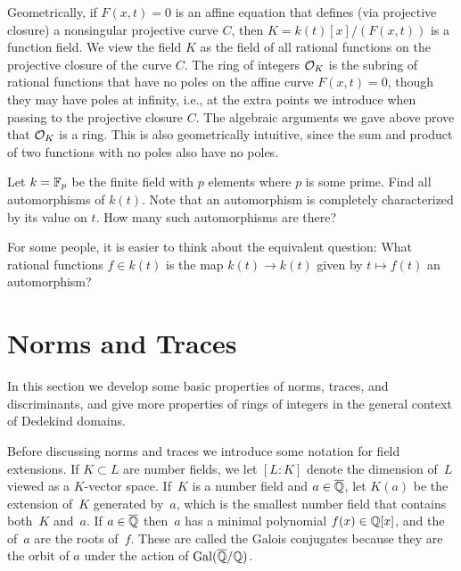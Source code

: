 Geometrically, if $F(x,t)=0$ is an affine equation that defines (via
projective closure) a nonsingular projective curve $C$, then
$K=k(t)[x]/(F(x,t))$ is a function field.  We view the field $K$ as
the field of all rational functions on the projective closure of the
curve $C$.  The ring of integers $\mathcal{O}_K$ is the subring of rational
functions that have no poles on the affine curve $F(x,t)=0$, though
they may have poles at infinity, i.e., at the extra points we
introduce when passing to the projective closure $C$.  The algebraic
arguments we gave above prove that $\mathcal{O}_K$ is a ring.  This is also
geometrically intuitive, since the sum and product of two functions
with no poles also have no poles.

\begin{exercise}
	Let $k = \mathbb{F}_p$ be the finite field with $p$ elements where $p$ is some prime. Find all automorphisms of $k(t)$. Note that an automorphism is completely characterized by its value on $t$. How many such automorphisms are there?

	\begin{hint}
		For some people, it is easier to think about the equivalent question: What rational functions $f\in k(t)$ is the map $k(t)\to k(t)$ given by $t\mapsto f(t)$ an automorphism?
	\end{hint}
\end{exercise}

\section{Norms and Traces}
In this section we develop some basic properties of norms, traces, and
discriminants, and give more properties of rings of integers in the
general context of Dedekind domains.

Before discussing norms and traces we introduce some notation for
field extensions.  If $K\subset L$ are number fields, we let $[L:K]$
denote the dimension of~$L$ viewed as a $K$-vector space.  If~$K$ is a
number field and $a\in \overline{\mathbb{Q}}$, let $K(a)$ be the extension of~$K$
generated by~$a$, which is the smallest number field that contains
both~$K$ and~$a$.  If $a\in\overline{\mathbb{Q}}$ then~$a$ has a minimal polynomial
$f(x)\in\mathbb{Q}[x]$, and the  of~$a$ are the roots
of~$f$. These are called the Galois conjugates because they are the orbit
of $a$ under the action of $\operatorname{Gal}(\overline{\mathbb{Q}}/\mathbb{Q})$.  

